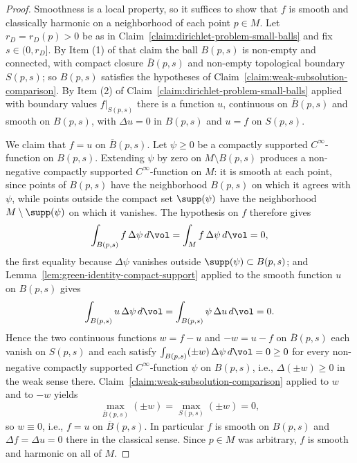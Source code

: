 \begin{proof}
Smoothness is a local property, so it suffices to show that $f$ is
smooth and classically harmonic on a neighborhood of each point
$p\in M$. Let $r_D=r_D(p)>0$ be as in
Claim~\ref{claim:dirichlet-problem-small-balls} and fix
$s\in(0,r_D]$. By Item (1) of that claim the ball $B(p,s)$ is
non-empty and connected, with compact closure $\overline{B}(p,s)$
and non-empty topological boundary $S(p,s)$; so $B(p,s)$ satisfies
the hypotheses of Claim~\ref{claim:weak-subsolution-comparison}.
By Item (2) of Claim~\ref{claim:dirichlet-problem-small-balls}
applied with boundary values $f|_{S(p,s)}$ there is a function
$u$, continuous on $\overline{B}(p,s)$ and smooth on $B(p,s)$,
with $\Delta u=0$ in $B(p,s)$ and $u=f$ on $S(p,s)$.

We claim that $f=u$ on $\overline{B}(p,s)$. Let $\psi\ge0$ be a
compactly supported $C^\infty$-function on $B(p,s)$. Extending
$\psi$ by zero on $M\setminus B(p,s)$ produces a non-negative
compactly supported $C^\infty$-function on $M$: it is smooth at
each point, since points of $B(p,s)$ have the neighborhood
$B(p,s)$ on which it agrees with $\psi$, while points outside the
compact set $\supp(\psi)$ have the neighborhood
$M\setminus\supp(\psi)$ on which it vanishes. The hypothesis on
$f$ therefore gives
$$\int_{B(p,s)}f\,\Delta\psi\,d\vol=\int_Mf\,\Delta\psi\,d\vol=0,$$
the first equality because $\Delta\psi$ vanishes outside
$\supp(\psi)\subset B(p,s)$; and
Lemma~\ref{lem:green-identity-compact-support} applied to the
smooth function $u$ on $B(p,s)$ gives
$$\int_{B(p,s)}u\,\Delta\psi\,d\vol
=\int_{B(p,s)}\psi\,\Delta u\,d\vol=0.$$
Hence the two continuous functions $w=f-u$ and $-w=u-f$ on
$\overline{B}(p,s)$ each vanish on $S(p,s)$ and each satisfy
$\int_{B(p,s)}(\pm w)\,\Delta\psi\,d\vol=0\ge0$ for every
non-negative compactly supported $C^\infty$-function $\psi$ on
$B(p,s)$, i.e., $\Delta(\pm w)\ge0$ in the weak sense there.
Claim~\ref{claim:weak-subsolution-comparison} applied to $w$ and
to $-w$ yields
$$\max_{\overline{B}(p,s)}(\pm w)=\max_{S(p,s)}(\pm w)=0,$$
so $w\equiv0$, i.e., $f=u$ on $\overline{B}(p,s)$. In particular
$f$ is smooth on $B(p,s)$ and $\Delta f=\Delta u=0$ there in the
classical sense. Since $p\in M$ was arbitrary, $f$ is smooth and
harmonic on all of $M$.
\end{proof}


